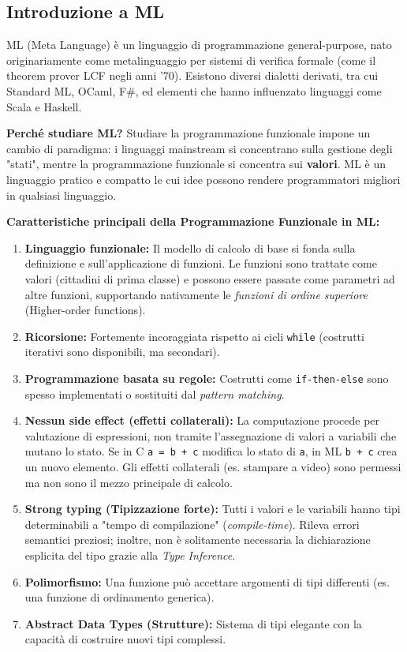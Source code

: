 \documentclass[12pt, a4paper]{article}
\begin{document}
\subsection{Introduzione a ML}
ML (Meta Language) è un linguaggio di programmazione general-purpose, nato originariamente come metalinguaggio per sistemi di verifica formale (come il theorem prover LCF negli anni '70). Esistono diversi dialetti derivati, tra cui Standard ML, OCaml, F\#, ed elementi che hanno influenzato linguaggi come Scala e Haskell.  

\textbf{Perché studiare ML?}
Studiare la programmazione funzionale impone un cambio di paradigma: i linguaggi mainstream si concentrano sulla gestione degli "stati", mentre la programmazione funzionale si concentra sui \textbf{valori}. ML è un linguaggio pratico e compatto le cui idee possono rendere programmatori migliori in qualsiasi linguaggio.  

\textbf{Caratteristiche principali della Programmazione Funzionale in ML:}
\begin{enumerate}

\newpage

\item \textbf{Linguaggio funzionale:} Il modello di calcolo di base si fonda sulla definizione e sull'applicazione di funzioni. Le funzioni sono trattate come valori (cittadini di prima classe) e possono essere passate come parametri ad altre funzioni, supportando nativamente le \textit{funzioni di ordine superiore} (Higher-order functions).
\item \textbf{Ricorsione:} Fortemente incoraggiata rispetto ai cicli \texttt{while} (costrutti iterativi sono disponibili, ma secondari).
\item \textbf{Programmazione basata su regole:} Costrutti come \texttt{if-then-else} sono spesso implementati o sostituiti dal \textit{pattern matching}.
\item \textbf{Nessun side effect (effetti collaterali):} La computazione procede per valutazione di espressioni, non tramite l'assegnazione di valori a variabili che mutano lo stato. Se in C \texttt{a = b + c} modifica lo stato di \texttt{a}, in ML \texttt{b + c} crea un nuovo elemento. Gli effetti collaterali (es. stampare a video) sono permessi ma non sono il mezzo principale di calcolo.
\item \textbf{Strong typing (Tipizzazione forte):} Tutti i valori e le variabili hanno tipi determinabili a "tempo di compilazione" (\textit{compile-time}). Rileva errori semantici preziosi; inoltre, non è solitamente necessaria la dichiarazione esplicita del tipo grazie alla \textit{Type Inference}.
\item \textbf{Polimorfismo:} Una funzione può accettare argomenti di tipi differenti (es. una funzione di ordinamento generica).
\item \textbf{Abstract Data Types (Strutture):} Sistema di tipi elegante con la capacità di costruire nuovi tipi complessi.
\end{enumerate}  
\end{document}
